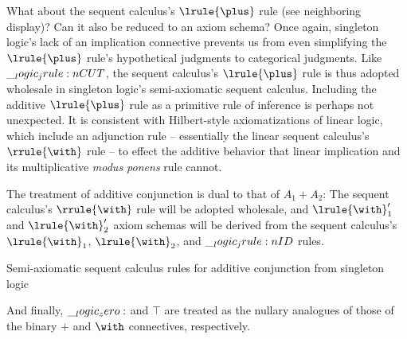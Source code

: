 What about the sequent calculus's $\lrule{\plus}$ rule (see neighboring display)?%
Can it also be reduced to an axiom schema?
Once again, singleton logic's lack of an implication connective prevents us from even simplifying the $\lrule{\plus}$ rule's hypothetical judgments to categorical judgments.
Like $\__logic_jrule:n {CUT}$, the sequent calculus's $\lrule{\plus}$ rule is thus adopted wholesale in singleton logic's semi-axiomatic sequent calculus.
Including the additive $\lrule{\plus}$ rule as a primitive rule of inference is perhaps not unexpected.
It is consistent with Hilbert-style axiomatizations of linear logic\autocite{Avron:TCS88}, which include an adjunction rule -- essentially the linear sequent calculus's $\rrule{\with}$ rule -- to effect the additive behavior that linear implication and its multiplicative \emph{modus ponens} rule cannot.


The treatment of additive conjunction is dual to that of $A_1 \plus A_2$:
The sequent calculus's $\rrule{\with}$ rule will be adopted wholesale, and $\lrule{\with}'_1$ and $\lrule{\with}'_2$ axiom schemas will be derived from the sequent calculus's $\lrule{\with}_1$, $\lrule{\with}_2$, and $\__logic_jrule:n {ID}$ rules.
%
\begin{marginfigure}
  \caption{Semi-axiomatic sequent calculus rules for additive conjunction from singleton logic}
\end{marginfigure}%
%
And finally, $\__logic_zero:$ and $\top$ are treated as the nullary analogues of those of the binary $\plus$ and $\with$ connectives, respectively.

